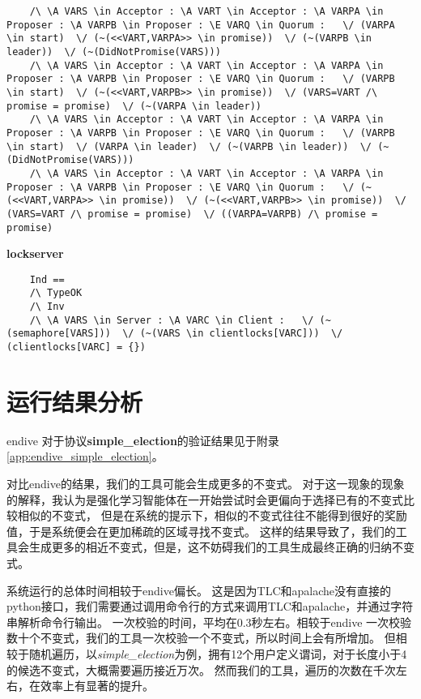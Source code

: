 \begin{lstlisting}
    /\ \A VARS \in Acceptor : \A VART \in Acceptor : \A VARPA \in Proposer : \A VARPB \in Proposer : \E VARQ \in Quorum :   \/ (VARPA \in start)  \/ (~(<<VART,VARPA>> \in promise))  \/ (~(VARPB \in leader))  \/ (~(DidNotPromise(VARS)))
    /\ \A VARS \in Acceptor : \A VART \in Acceptor : \A VARPA \in Proposer : \A VARPB \in Proposer : \E VARQ \in Quorum :   \/ (VARPB \in start)  \/ (~(<<VART,VARPB>> \in promise))  \/ (VARS=VART /\ promise = promise)  \/ (~(VARPA \in leader))
    /\ \A VARS \in Acceptor : \A VART \in Acceptor : \A VARPA \in Proposer : \A VARPB \in Proposer : \E VARQ \in Quorum :   \/ (VARPB \in start)  \/ (VARPA \in leader)  \/ (~(VARPB \in leader))  \/ (~(DidNotPromise(VARS)))
    /\ \A VARS \in Acceptor : \A VART \in Acceptor : \A VARPA \in Proposer : \A VARPB \in Proposer : \E VARQ \in Quorum :   \/ (~(<<VART,VARPA>> \in promise))  \/ (~(<<VART,VARPB>> \in promise))  \/ (VARS=VART /\ promise = promise)  \/ ((VARPA=VARPB) /\ promise = promise)
\end{lstlisting}

\textbf{lockserver}
\begin{lstlisting}
    Ind == 
    /\ TypeOK
    /\ Inv
    /\ \A VARS \in Server : \A VARC \in Client :   \/ (~(semaphore[VARS]))  \/ (~(VARS \in clientlocks[VARC]))  \/ (clientlocks[VARC] = {})
\end{lstlisting}

\section{运行结果分析}
endive 对于协议\textbf{simple\_election}的验证结果见于附录\ref{app:endive_simple_election}。

对比endive的结果，我们的工具可能会生成更多的不变式。
对于这一现象的现象的解释，我认为是强化学习智能体在一开始尝试时会更偏向于选择已有的不变式比较相似的不变式，
但是在系统的提示下，相似的不变式往往不能得到很好的奖励值，于是系统便会在更加稀疏的区域寻找不变式。
这样的结果导致了，我们的工具会生成更多的相近不变式，但是，这不妨碍我们的工具生成最终正确的归纳不变式。

系统运行的总体时间相较于endive偏长。
这是因为TLC和apalache没有直接的python接口，我们需要通过调用命令行的方式来调用TLC和apalache，并通过字符串解析命令行输出。
一次校验的时间，平均在0.3秒左右。相较于endive 一次校验数十个不变式，我们的工具一次校验一个不变式，所以时间上会有所增加。
但相较于随机遍历，以\textit{simple\_election}为例，拥有12个用户定义谓词，对于长度小于4的候选不变式，大概需要遍历接近万次。
然而我们的工具，遍历的次数在千次左右，在效率上有显著的提升。


